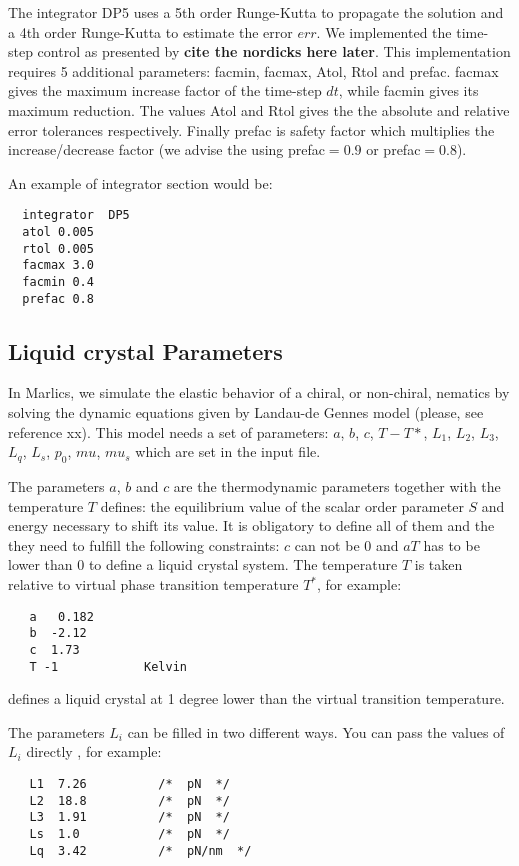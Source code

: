 \documentclass{article}
\begin{document}
The integrator DP5 uses a 5th order Runge-Kutta to propagate the
solution and a 4th order Runge-Kutta to estimate the error $err$. We
implemented the time-step control as presented by \textbf{cite the
  nordicks here later}. This implementation requires 5 additional
parameters: facmin, facmax, Atol, Rtol and prefac. facmax gives the
maximum increase factor of the time-step $dt$, while facmin gives its
maximum reduction. The values Atol and Rtol gives the the absolute and
relative error tolerances respectively. Finally prefac is safety
factor which multiplies the increase/decrease factor (we advise the
using prefac$=0.9$ or prefac$=0.8$).

 An example of integrator section would be:
\begin{lstlisting}
  integrator  DP5
  atol 0.005
  rtol 0.005
  facmax 3.0
  facmin 0.4
  prefac 0.8
\end{lstlisting}

\subsection{Liquid crystal Parameters}\label{lc.param}

In Marlics, we simulate the elastic behavior of a chiral, or non-chiral, nematics by solving the dynamic equations given by Landau-de Gennes 
model (please, see reference xx). This model needs a set of parameters: $a$, $b$, $c$, $T-T*$, $L_1$, $L_2$, $L_3$, $L_q$, $L_s$, $p_0$, $mu$, $mu_s$ which are set in the input file.

The parameters $a$, $b$ and $c$ are the thermodynamic parameters
together with the temperature $T$ defines: the equilibrium value of
the scalar order parameter $S$ and energy necessary to shift its
value. It is obligatory to define all of them and the they need to
fulfill the following constraints: $c$ can not be 0 and $a T$ has to
be lower than 0 to define a liquid crystal system. The temperature $T$
is taken relative to virtual phase transition temperature $T^*$, for
example:
\begin{lstlisting}	
   a   0.182
   b  -2.12
   c  1.73
   T -1            Kelvin
\end{lstlisting}
defines a liquid crystal at 1 degree lower than the virtual transition
temperature.

The parameters $L_i$ can be filled in two different ways. You can pass the values of $L_i$ directly , for example:
\begin{lstlisting}
   L1  7.26          /*  pN  */
   L2  18.8          /*  pN  */
   L3  1.91          /*  pN  */
   Ls  1.0           /*  pN  */
   Lq  3.42          /*  pN/nm  */
\end{lstlisting}
\end{document}
